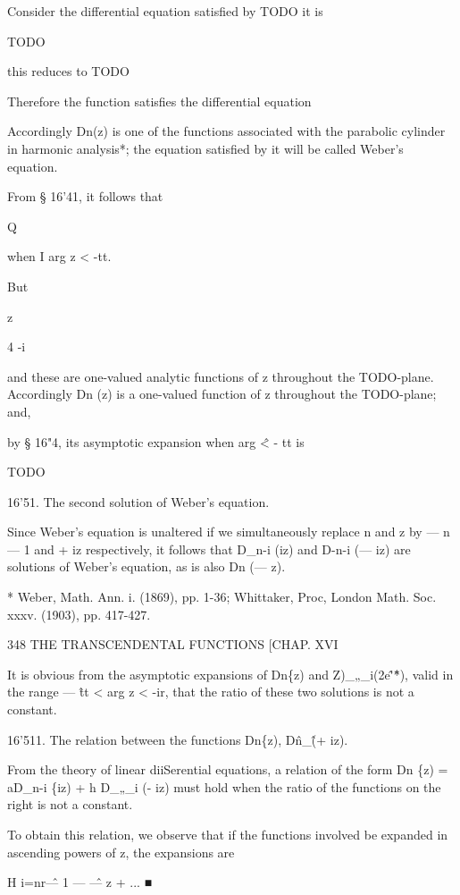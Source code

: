 
Consider the differential equation satisfied by TODO it is

TODO

this reduces to TODO

Therefore the function satisfies the differential equation

Accordingly Dn(z) is one of the functions associated with the
parabolic cylinder in harmonic analysis*; the equation satisfied by it
will be called Weber's equation.

From § 16'41, it follows that

Q

when I arg z < -tt.

But

z

4 -i

and these are one-valued analytic functions of z throughout the
TODO-plane. Accordingly Dn (z) is a one-valued function of z
throughout the TODO-plane; and,

by § 16"4, its asymptotic expansion when arg \^ < - tt is

TODO

16'51. The second solution of Weber's equation.

Since Weber's equation is unaltered if we simultaneously replace n and
z by — n — 1 and + iz respectively, it follows that D\_n-i (iz) and
D-n-i (— iz) are solutions of Weber's equation, as is also Dn (— z).

* Weber, Math. Ann. i. (1869), pp. 1-36; Whittaker, Proc, London Math.
Soc. xxxv. (1903), pp. 417-427.

348 THE TRANSCENDENTAL FUNCTIONS [CHAP. XVI

It is obvious from the asymptotic expansions of Dn\{z) and
Z)\_„\_i(2e\^'\^*), valid in the range — \^ tt < arg z < -ir, that the
ratio of these two solutions is not a constant.

16'511. The relation between the functions Dn\{z), D\^n\_\^ (+ iz).

From the theory of linear diiSerential equations, a relation of the
form Dn \{z) = aD\_n-i \{iz) + h D\_„\_i (- iz) must hold when the
ratio of the functions on the right is not a constant.

To obtain this relation, we observe that if the functions involved be
expanded in ascending powers of z, the expansions are

H i=nr\^ — 1 — \^ — z + ... ■

